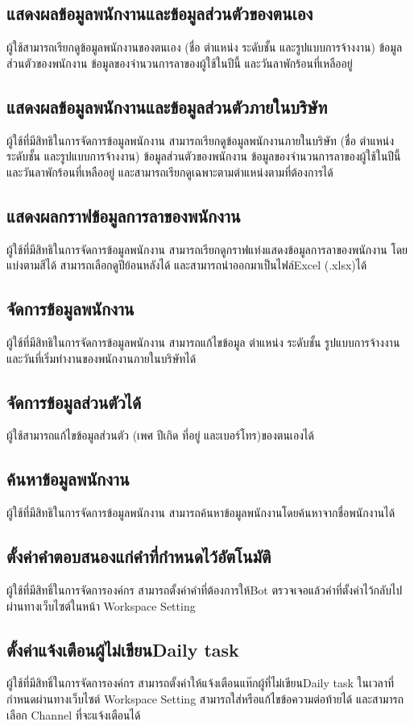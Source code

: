 \subsection{แสดงผลข้อมูลพนักงานและข้อมูลส่วนตัวของตนเอง}
ผู้ใช้สามารถเรียกดูข้อมูลพนักงานของตนเอง (ชื่อ ตำแหน่ง ระดับชั้น และรูปแบบการจ้างงาน) ข้อมูลส่วนตัวของพนักงาน ข้อมูลของจำนวนการลาของผู้ใช้ในปีนี้ และวันลาพักร้อนที่เหลืออยู่
\subsection{แสดงผลข้อมูลพนักงานและข้อมูลส่วนตัวภายในบริษัท}
ผู้ใช้ที่มีสิทธิในการจัดการข้อมูลพนักงาน สามารถเรียกดูข้อมูลพนักงานภายในบริษัท (ชื่อ ตำแหน่ง ระดับชั้น และรูปแบบการจ้างงาน) ข้อมูลส่วนตัวของพนักงาน
ข้อมูลของจำนวนการลาของผู้ใช้ในปีนี้ และวันลาพักร้อนที่เหลืออยู่ และสามารถเรียกดูเฉพาะตามตำแหน่งตามที่ต้องการได้
\subsection{แสดงผลกราฟข้อมูลการลาของพนักงาน}
ผู้ใช้ที่มีสิทธิในการจัดการข้อมูลพนักงาน สามารถเรียกดูกราฟแท่งแสดงข้อมูลการลาของพนักงาน โดยแบ่งตามสีได้ สามารถเลือกดูปีย้อนหลังได้ และสามารถนำออกมาเป็นไฟล์Excel (.xlsx)ได้
\subsection{จัดการข้อมูลพนักงาน}
ผู้ใช้ที่มีสิทธิในการจัดการข้อมูลพนักงาน สามารถแก้ไขข้อมูล ตำแหน่ง ระดับชั้น รูปแบบการจ้างงาน และวันที่เริ่มทำงานของพนักงานภายในบริษัทได้
\subsection{จัดการข้อมูลส่วนตัวได้}
ผู้ใช้สามารถแก้ไขข้อมูลส่วนตัว (เพศ ปีเกิด ที่อยู่ และเบอร์โทร)ของตนเองได้
\subsection{ค้นหาข้อมูลพนักงาน}
ผู้ใช้ที่มีสิทธิในการจัดการข้อมูลพนักงาน สามารถค้นหาข้อมูลพนักงานโดยค้นหาจากชื่อพนักงานได้



\subsection{ตั้งค่าคำตอบสนองแก่คำที่กำหนดไว้อัตโนมัติ}
ผู้ใช้ที่มีสิทธิ์ในการจัดการองค์กร สามารถตั้งค่าคำที่ต้องการให้Bot ตรวจเจอแล้วคำที่ตั้งค่าไว้กลับไป ผ่านทางเว็บไซต์ในหน้า Workspace Setting
\subsection{ตั้งค่าแจ้งเตือนผู้ไม่เขียนDaily task}
ผู้ใช้ที่มีสิทธิ์ในการจัดการองค์กร สามารถตั้งค่าให้แจ้งเตือนแท๊กผู้ที่ไม่เขียนDaily task ในเวลาที่กำหนดผ่านทางเว็บไซต์ Workspace Setting สามารถใส่หรือแก้ไขข้อความต่อท้ายได้ และสามารถเลือก Channel ที่จะแจ้งเตือนได้
